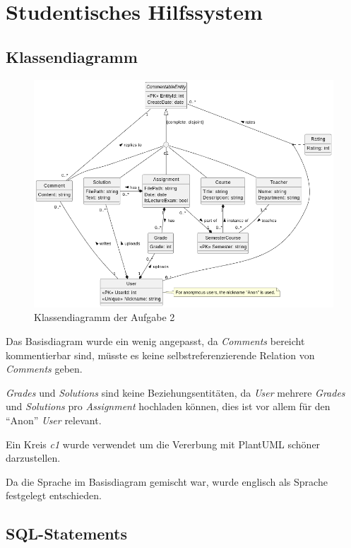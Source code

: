 \documentclass[12pt]{scrartcl}
\begin{document}
\section{Studentisches Hilfssystem}
\subsection{Klassendiagramm}

\begin{figure}[h]
    \centering
    \includegraphics[width=0.9\linewidth]{../UE1_2.png}
    \caption{Klassendiagramm der Aufgabe 2}
\end{figure}

Das Basisdiagram wurde ein wenig angepasst, da \emph{Comments} bereicht kommentierbar sind,
müsste es keine selbstreferenzierende Relation von \emph{Comments} geben.\par

\emph{Grades} und \emph{Solutions} sind keine Beziehungsentitäten,
da \emph{User} mehrere \emph{Grades} und \emph{Solutions} pro \emph{Assignment} hochladen können,
dies ist vor allem für den \enquote{Anon} \emph{User} relevant.\par

Ein Kreis \emph{c1} wurde verwendet um die Vererbung mit PlantUML schöner darzustellen.\par

Da die Sprache im Basisdiagram gemischt war, wurde englisch als Sprache festgelegt entschieden.
\pagebreak

\subsection{SQL-Statements}
\inputminted{sql}{../UE1_2.sql}
\pagebreak
\end{document}
